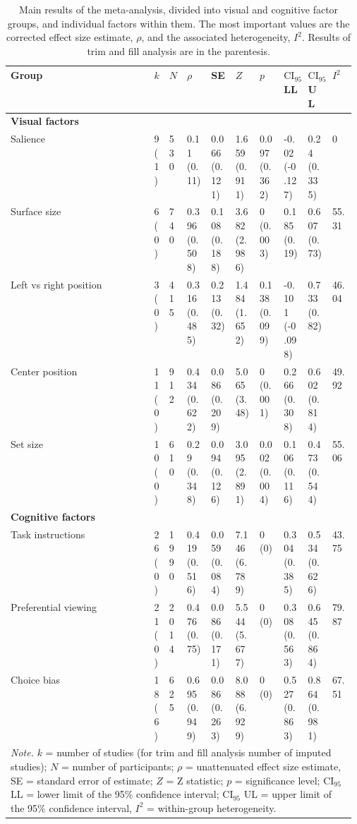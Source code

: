 \begin{table}[ht]
\centering
\caption{Main results of the meta-analysis, divided into visual and cognitive factor groups, and individual factors within them. The most important values are the corrected effect size estimate, $\rho$, and the associated heterogeneity, $I^2$. Results of trim and fill analysis are in the parentesis.} 
\label{tab:main_results}
\begingroup\small
\begin{tabular}{lp{0.03\linewidth}p{0.05\linewidth}p{0.07\linewidth}p{0.07\linewidth}p{0.07\linewidth}p{0.07\linewidth}p{0.07\linewidth}p{0.07\linewidth}p{0.07\linewidth}}
  \hline
Group & $k$ & $N$ & $\rho$ & SE & $Z$ & $p$ & $\textrm{CI}_{95}$ LL & $\textrm{CI}_{95}$ UL & $I^2$ \\ 
  \hline
\textbf{Visual factors} &  &  &  &  &  &  &  &  &  \\ 
  Salience & 9 (1) & 530 & 0.11 (0.11) & 0.066 (0.121) & 1.659 (0.911) & 0.097 (0.362) & -0.02 (-0.127) & 0.24 (0.335) & 0 \\ 
  Surface size & 6 (0) & 740 & 0.396 (0.508) & 0.108 (0.188) & 3.682 (2.986) & 0 (0.003) & 0.185 (0.19) & 0.607 (0.73) & 55.31 \\ 
  Left vs right position & 3 (0) & 415 & 0.316 (0.485) & 0.213 (0.32) & 1.484 (1.652) & 0.138 (0.099) & -0.101 (-0.098) & 0.733 (0.82) & 46.04 \\ 
  Center position & 11 (0) & 912 & 0.434 (0.622) & 0.086 (0.209) & 5.065 (3.48) & 0 (0.001) & 0.266 (0.308) & 0.602 (0.814) & 49.92 \\ 
  Set size & 10 (0) & 610 & 0.29 (0.348) & 0.094 (0.126) & 3.095 (2.891) & 0.002 (0.004) & 0.106 (0.116) & 0.473 (0.544) & 55.06 \\ 
  \textbf{Cognitive factors} &  &  &  &  &  &  &  &  &  \\ 
  Task instructions & 26 (0) & 1990 & 0.419 (0.516) & 0.059 (0.084) & 7.146 (6.789) & 0 (0) & 0.304 (0.385) & 0.534 (0.626) & 43.75 \\ 
  Preferential viewing & 21 (0) & 2014 & 0.476 (0.75) & 0.086 (0.171) & 5.544 (5.677) & 0 (0) & 0.308 (0.563) & 0.645 (0.864) & 79.87 \\ 
  Choice bias & 18 (6) & 625 & 0.695 (0.949) & 0.086 (0.263) & 8.088 (6.929) & 0 (0) & 0.527 (0.863) & 0.864 (0.981) & 67.51 \\ 
   \hline 
 \multicolumn{10}{p{0.9\textwidth}}{\scriptsize{\textit{Note.} $k$ = number of studies (for trim and fill analysis number of imputed studies); $N$ = number of participants; $\rho$ = unattenuated effect size estimate, SE = standard error of estimate; $Z$ = Z statistic; $p$ = significance level; $\textrm{CI}_{95}$ LL = lower limit of the 95\% confidence interval; $\textrm{CI}_{95}$ UL = upper limit of the 95\% confidence interval, $I^2$ = within-group heterogeneity.}} 
\end{tabular}
\endgroup
\end{table}
